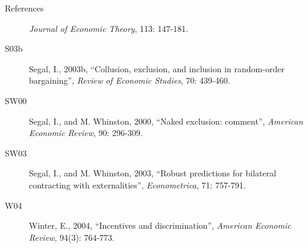 \documentclass[11pt,english]{beamer}
\begin{document}
\begin{frame}[allowframebreaks]{References}
\begin{description}
    \emph{Journal of Economic Theory}, 113: 147-181.
  \item[S03b] Segal, I., 2003b, ``Collusion, exclusion, and inclusion
    in random-order bargaining'', \emph{Review of Economic Studies},
    70: 439-460.
  \item[SW00] Segal, I., and M. Whinston, 2000, ``Naked exclusion:
    comment'', \emph{American Economic Review}, 90: 296-309.
  \item[SW03] Segal, I., and M. Whinston, 2003, ``Robust predictions
    for bilateral contracting with externalities'',
    \emph{Econometrica}, 71: 757-791.
  \item[W04] Winter, E., 2004, ``Incentives and discrimination'',
    \emph{American Economic Review}, 94(3): 764-773.
  \end{description}
\end{frame}
\end{document}
